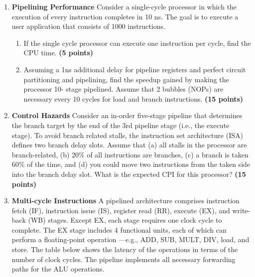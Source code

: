 \documentclass[a4paper, 11pt]{exam}
\begin{document}
\begin{enumerate}
	\item \textbf {Pipelining Performance}
    Consider a single-cycle processor in which the execution of
every instruction completes in 10 ns. The goal is to execute a user application that consists of 1000 instructions.
	\begin{enumerate}
    \item If the single cycle processor can execute one instruction per cycle, find the CPU time. \textbf{(5 points)}
    
    \newline
    
   
    \item Assuming a 1ns additional delay for pipeline registers and perfect circuit partitioning and pipelining, find the speedup gained by making the processor 10- stage pipelined. Assume that 2 bubbles (NOPs) are necessary every 10 cycles for load and branch instructions. \textbf{(15 points)}
    
	\newline
    
	\end{enumerate}
    
    \item \textbf{Control Hazards} Consider an in-order five-stage pipeline that determines the branch
target by the end of the 3rd pipeline stage (i.e., the execute stage). To avoid branch related stalls, the instruction set architecture (ISA) defines two branch delay slots. Assume that (a) all stalls in the processor are branch-related, (b) $20\%$ of all instructions are branches, (c) a branch is taken $60\%$ of the time, and (d) you could move two instructions from the taken side into the branch delay slot. What is the expected CPI for
this processor? \textbf{(15 points)} 

	\newline
    
	\item \textbf{Multi-cycle Instructions} A pipelined architecture comprises instruction fetch (IF), instruction issue (IS), register read (RR), execute (EX), and write-back (WB) stages. Except EX, each stage requires one clock cycle to complete. The EX stage includes 4
functional units, each of which can perform a floating-point operation —e.g., ADD, SUB, MULT, DIV, load, and store. The table below shows the latency of the operations in terms of the number of clock cycles. The pipeline implements all necessary forwarding paths for the ALU operations.


\end{enumerate}
\end{document}

